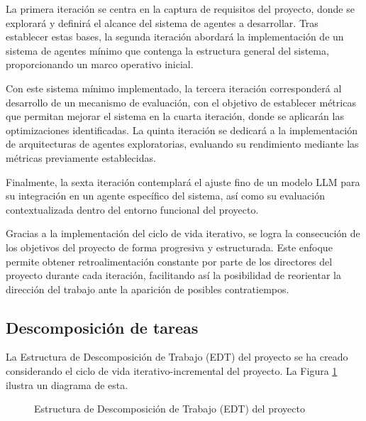 La primera iteración se centra en la captura de requisitos del proyecto, donde se explorará y definirá el alcance del sistema de agentes a desarrollar. Tras establecer estas bases, la segunda iteración abordará la implementación de un sistema de agentes mínimo que contenga la estructura general del sistema, proporcionando un marco operativo inicial.

Con este sistema mínimo implementado, la tercera iteración corresponderá al desarrollo de un mecanismo de evaluación, con el objetivo de establecer métricas que permitan mejorar el sistema en la cuarta iteración, donde se aplicarán las optimizaciones identificadas. La quinta iteración se dedicará a la implementación de arquitecturas de agentes exploratorias, evaluando su rendimiento mediante las métricas previamente establecidas.

Finalmente, la sexta iteración contemplará el ajuste fino de un modelo LLM para su integración en un agente específico del sistema, así como su evaluación contextualizada dentro del entorno funcional del proyecto.

Gracias a la implementación del ciclo de vida iterativo, se logra la consecución de los objetivos del proyecto de forma progresiva y estructurada. Este enfoque permite obtener retroalimentación constante por parte de los directores del proyecto durante cada iteración, facilitando así la posibilidad de reorientar la dirección del trabajo ante la aparición de posibles contratiempos.

\subsection{Descomposición de tareas}
La Estructura de Descomposición de Trabajo (EDT) del proyecto se ha creado considerando el ciclo de vida iterativo-incremental del proyecto. La Figura \ref{fig:edt} ilustra un diagrama de esta. 

\begin{figure}[h]
  \centering
  \caption{Estructura de Descomposición de Trabajo (EDT) del proyecto}
  \label{fig:edt}
\end{figure}



